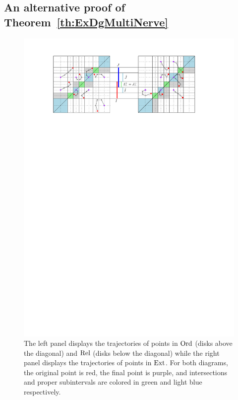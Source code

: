 \subsection{An alternative proof of Theorem~\ref{th:ExDgMultiNerve}}
\label{sec:alternateproof}

\begin{figure}[h]
\begin{center}
\includegraphics[width=14cm]{figures/FullTransformPD}
\caption[Full transformation on persistence diagrams]{\label{fig:pdTRANS}
The left panel displays
the trajectories of points in $\mathrm{Ord}$ (disks above the diagonal) and $\mathrm{Rel}$ (disks below the diagonal) while
the right panel displays the trajectories of points in $\mathrm{Ext}$.
For both diagrams, the original point is red, the final point is purple, and intersections and proper subintervals are colored
in green and light blue respectively. 
}
\end{center}
\end{figure}

